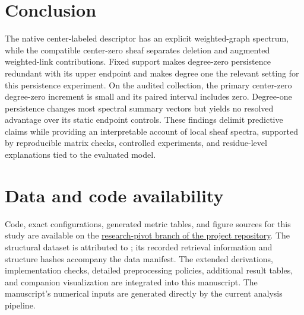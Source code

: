 \documentclass[11pt]{article}
\begin{document}
\section{Conclusion}
The native center-labeled descriptor has an explicit weighted-graph spectrum, while the compatible center-zero sheaf separates deletion and augmented weighted-link contributions. Fixed support makes degree-zero persistence redundant with its upper endpoint and makes degree one the relevant setting for this persistence experiment. On the audited collection, the primary center-zero degree-zero increment is small and its paired interval includes zero. Degree-one persistence changes most spectral summary vectors but yields no resolved advantage over its static endpoint controls. These findings delimit predictive claims while providing an interpretable account of local sheaf spectra, supported by reproducible matrix checks, controlled experiments, and residue-level explanations tied to the evaluated model.

\section*{Data and code availability}
Code, exact configurations, generated metric tables, and figure sources for this study are available on the \href{https://github.com/ryan-charette/psl-protein-flexibility/tree/research-pivot}{research-pivot branch of the project repository}. The structural dataset is attributed to \citet{feng2025}; its recorded retrieval information and structure hashes accompany the data manifest. The extended derivations, implementation checks, detailed preprocessing policies, additional result tables, and companion visualization are integrated into this manuscript. The manuscript's numerical inputs are generated directly by the current analysis pipeline.



\end{document}
